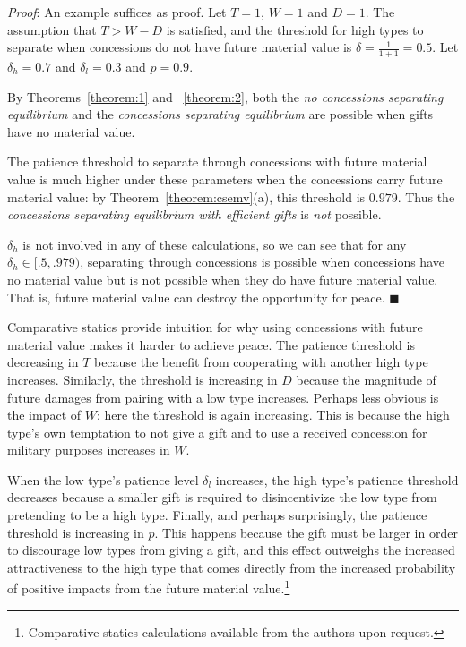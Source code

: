 \documentclass[12pt, letterpaper]{article}
\newcommand{\de}{\delta}
\begin{document}
\emph{Proof}: An example suffices as proof. Let $T = 1$, $W=1$ and $D = 1$. The assumption that $T > W - D$ is satisfied, and the threshold for high types to separate when concessions do not have future material value is $\de = \frac{1}{1+1} = 0.5$. Let $\de_h = 0.7$ and $\de_l = 0.3$ and $p = 0.9$.

By Theorems~\ref{theorem:1} and ~\ref{theorem:2}, both the \emph{no concessions separating equilibrium} and the \emph{concessions separating equilibrium} are possible when gifts have no material value.

The patience threshold to separate through concessions with future material value is much higher under these parameters when the concessions carry future material value: by Theorem~\ref{theorem:csemv}(a), this threshold is $0.979$. Thus the \emph{concessions separating equilibrium with efficient gifts} is \emph{not} possible. 

$\de_h$ is not involved in any of these calculations, so we can see that for any $\de_h \in [.5,.979)$, separating through concessions is possible when concessions have no material value but is not possible when they do have future material value. That is, future material value can destroy the opportunity for peace. \hfill $\blacksquare$ 

Comparative statics provide intuition for why using concessions with future material value makes it harder to achieve peace. The patience threshold is decreasing in $T$ because the benefit from cooperating with another high type increases. Similarly, the threshold is increasing in $D$ because the magnitude of future damages from pairing with a low type increases. Perhaps less obvious is the impact of $W$: here the threshold is again increasing. This is because the high type's own temptation to not give a gift and to use a received concession for military purposes increases in $W$.

When the low type's patience level $\de_l$ increases, the high type's patience threshold decreases because a smaller gift is required to disincentivize the low type from pretending to be a high type. Finally, and perhaps surprisingly, the patience threshold is increasing in $p$. This happens because the gift must be larger in order to discourage low types from giving a gift, and this effect outweighs the increased attractiveness to the high type that comes directly from the increased probability of positive impacts from the future material value.\footnote{Comparative statics calculations available from the authors upon request.} 
\end{document}
